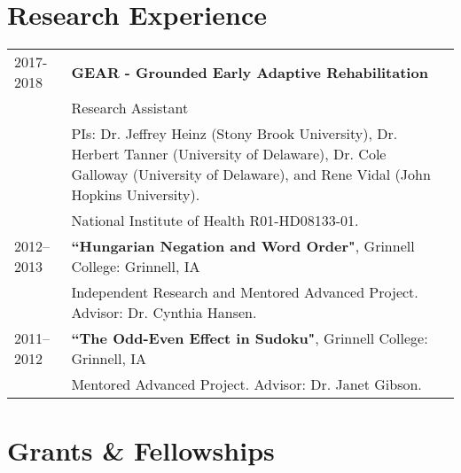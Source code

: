\documentclass[11pt]{article} %
\begin{document}
\section*{Research Experience}
\begin{longtable}{p{1in} p{5.3in}}
	2017-2018 & \textbf{GEAR - Grounded Early Adaptive Rehabilitation} \\
	& Research Assistant \\
	& PIs: Dr. Jeffrey Heinz (Stony Brook University), Dr. Herbert Tanner (University of Delaware), Dr. Cole Galloway (University of Delaware), and Rene Vidal (John Hopkins University).  \\ 
	& National Institute of Health R01-HD08133-01.\\[5pt]
	2012--2013 &\textbf{``Hungarian Negation and Word Order"}, Grinnell College: Grinnell, IA \\
	& Independent Research and Mentored Advanced Project. Advisor: Dr. Cynthia Hansen.\\ [5pt]
	2011--2012 & \textbf{``The Odd-Even Effect in Sudoku"}, Grinnell College: Grinnell, IA \\
	& Mentored Advanced Project. Advisor: Dr. Janet Gibson. \\
	
\end{longtable}


\section*{Grants \& Fellowships}
\end{document}
